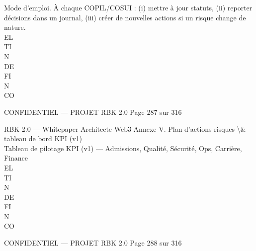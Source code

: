 \vspace{0.5em}
\vspace{0.5em}
Mode d’emploi.     À chaque COPIL/COSUI : (i) mettre à jour statuts, (ii) reporter décisions dans un journal, (iii) créer de nouvelles actions si un risque change de nature.\\
\vspace{0.5em}
\vspace{0.5em}
\vspace{0.5em}
\vspace{0.5em}
EL\\
TI\\
N\\
DE\\
FI\\
N\\
CO\\
\vspace{0.5em}
\vspace{0.5em}
\vspace{0.5em}
\vspace{0.5em}
\begin{confidential}CONFIDENTIEL — PROJET RBK 2.0                                                     Page 287 sur 316\end{confidential}
RBK 2.0 — Whitepaper Architecte Web3                           Annexe V. Plan d’actions risques \textbackslash{}& tableau de bord KPI (v1)\\
\vspace{0.5em}
\vspace{0.5em}
Tableau de pilotage KPI (v1) — Admissions, Qualité, Sécurité, Ops, Carrière, Finance\\
\vspace{0.5em}
\vspace{0.5em}
\vspace{0.5em}
\vspace{0.5em}
EL\\
TI\\
N\\
DE\\
FI\\
N\\
CO\\
\vspace{0.5em}
\vspace{0.5em}
\vspace{0.5em}
\vspace{0.5em}
\begin{confidential}CONFIDENTIEL — PROJET RBK 2.0               Page 288 sur 316\end{confidential}
